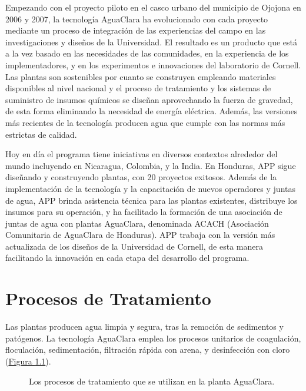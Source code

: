 \documentclass[letterpaper,10pt,spanish]{sphinxmanual}
\let\sphinxpxdimen\pdfpxdimen\else\newdimen\sphinxpxdimen
\begin{document}
Empezando con el proyecto piloto en el casco urbano del municipio de Ojojona en 2006 y 2007, la tecnología AguaClara ha evolucionado con cada proyecto mediante un proceso de integración de las experiencias del campo en las investigaciones y diseños de la Universidad. El resultado es un producto que está a la vez basado en las necesidades de las comunidades, en la experiencia de los implementadores, y en los experimentos e innovaciones del laboratorio de Cornell. Las plantas son sostenibles por cuanto se construyen empleando materiales disponibles al nivel nacional y el proceso de tratamiento y los sistemas de suministro de insumos químicos se diseñan aprovechando la fuerza de gravedad, de esta forma eliminando la necesidad de energía eléctrica. Además, las versiones más recientes de la tecnología producen agua que cumple con las normas más estrictas de calidad.

Hoy en día el programa tiene iniciativas en diversos contextos alrededor del mundo incluyendo en Nicaragua, Colombia, y la India. En Honduras, APP sigue diseñando y construyendo plantas, con 20 proyectos exitosos. Además de la implementación de la tecnología y la capacitación de nuevos operadores y juntas de agua, APP brinda asistencia técnica para las plantas existentes, distribuye los insumos para su operación, y ha facilitado la formación de una asociación de juntas de agua con plantas AguaClara, denominada ACACH (Asociación Comunitaria de AguaClara de Honduras). APP trabaja con la versión más actualizada de los diseños de la Universidad de Cornell, de esta manera facilitando la innovación en cada etapa del desarrollo del programa.


\chapter{Procesos de Tratamiento}
\label{\detokenize{Introduction/Treatment_Process:procesos-de-tratamiento}}\label{\detokenize{Introduction/Treatment_Process:title-procesos-de-tratamiento}}\label{\detokenize{Introduction/Treatment_Process::doc}}
Las plantas producen agua limpia y segura, tras la remoción de sedimentos y patógenos. La tecnología AguaClara emplea los procesos unitarios de coagulación, floculación, sedimentación, filtración rápida con arena, y desinfección con cloro (\hyperref[\detokenize{Introduction/Treatment_Process:figure-process}]{Figura \ref{\detokenize{Introduction/Treatment_Process:figure-process}}}).

\begin{figure}[htbp]
\centering
\capstart

\noindent\sphinxincludegraphics[width=650\sphinxpxdimen]{{process}.png}
\caption{Los procesos de tratamiento que se utilizan en la planta AguaClara.}\label{\detokenize{Introduction/Treatment_Process:id1}}\label{\detokenize{Introduction/Treatment_Process:figure-process}}\end{figure}
\end{document}
